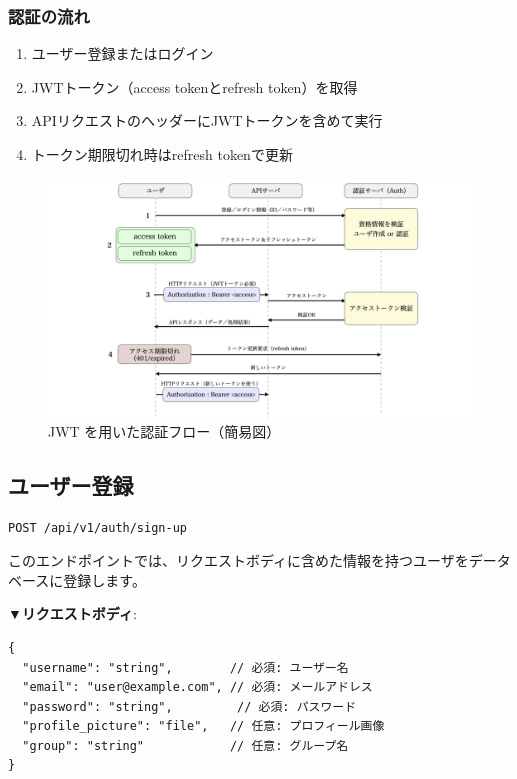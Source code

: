\documentclass[11pt,a4paper]{ltjsarticle}  %
\begin{document}
\subsubsection{認証の流れ}
\begin{enumerate}
    \item ユーザー登録またはログイン
    \item JWTトークン（access tokenとrefresh token）を取得
    \item APIリクエストのヘッダーにJWTトークンを含めて実行
    \item トークン期限切れ時はrefresh tokenで更新
\end{enumerate}
\begin{figure}[htbp]
\hspace{-2.3cm}
\includegraphics[scale = 0.3]{fig1.png}
\caption{JWT を用いた認証フロー（簡易図）}
\end{figure}


\subsection{ユーザー登録}

\begin{tcolorbox}[colback=blue!5,colframe=blue!50!black,title=エンドポイント]
\texttt{POST /api/v1/auth/sign-up}
\end{tcolorbox}

このエンドポイントでは、リクエストボディに含めた情報を持つユーザをデータベースに登録します。

\textbf{▼リクエストボディ}:
\begin{lstlisting}[style=json]
{
  "username": "string",        // 必須: ユーザー名
  "email": "user@example.com", // 必須: メールアドレス
  "password": "string",         // 必須: パスワード
  "profile_picture": "file",   // 任意: プロフィール画像
  "group": "string"            // 任意: グループ名
}
\end{lstlisting}
\end{document}
